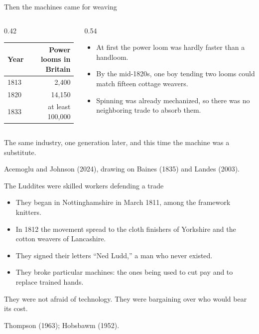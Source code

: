\documentclass[aspectratio=169,11pt]{beamer}
\begin{document}
\begin{frame}{Then the machines came for weaving}

\begin{columns}[c]
\begin{column}{0.42\textwidth}
\centering
{\footnotesize
\begin{tabular}{@{}lr@{}}
\toprule
\textbf{Year} & \textbf{Power looms in Britain} \\
\midrule
1813 & 2,400 \\
1820 & 14,150 \\
1833 & at least 100,000 \\
\bottomrule
\end{tabular}}
\end{column}
\begin{column}{0.54\textwidth}
\begin{itemize}\setlength\itemsep{0.3em}
    \item At first the power loom was hardly faster than a handloom.
    \item By the mid-1820s, one boy tending two looms could match fifteen cottage weavers.
    \item Spinning was already mechanized, so there was no neighboring trade to absorb them.
\end{itemize}
\end{column}
\end{columns}

\vspace{0.45cm}

\alert{The same industry, one generation later, and this time the machine was a substitute.}

\vspace{0.05cm}
{\scriptsize\color{warmgray}Acemoglu and Johnson (2024), drawing on Baines (1835) and Landes (2003).}

\end{frame}

\begin{frame}{The Luddites were skilled workers defending a trade}

\begin{itemize}\setlength\itemsep{0.4em}
    \item They began in Nottinghamshire in March 1811, among the framework knitters.
    \item In 1812 the movement spread to the cloth finishers of Yorkshire and the cotton weavers of Lancashire.
    \item They signed their letters ``Ned Ludd,'' a man who never existed.
    \item They broke particular machines: the ones being used to cut pay and to replace trained hands.
\end{itemize}

\vspace{0.4cm}

\alert{They were not afraid of technology. They were bargaining over who would bear its cost.}

\vspace{0.05cm}
{\scriptsize\color{warmgray}Thompson (1963); Hobsbawm (1952).}

\end{frame}
\end{document}
